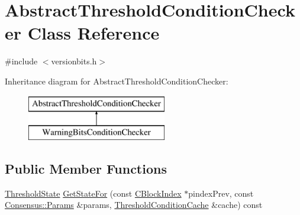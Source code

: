 \hypertarget{class_abstract_threshold_condition_checker}{}\section{Abstract\+Threshold\+Condition\+Checker Class Reference}
\label{class_abstract_threshold_condition_checker}


{\ttfamily \#include $<$versionbits.\+h$>$}

Inheritance diagram for Abstract\+Threshold\+Condition\+Checker\+:\begin{figure}[H]
\begin{center}
\leavevmode
\includegraphics[height=2.000000cm]{class_abstract_threshold_condition_checker}
\end{center}
\end{figure}
\subsection*{Public Member Functions}
\begin{DoxyCompactItemize}
\item 
\mbox{\hyperlink{versionbits_8h_ae7f620361ae33b80687a42adb26fd7a4}{Threshold\+State}} \mbox{\hyperlink{class_abstract_threshold_condition_checker_a7986d06396d52f6961d7c983dc68b8f3}{Get\+State\+For}} (const \mbox{\hyperlink{class_c_block_index}{C\+Block\+Index}} $\ast$pindex\+Prev, const \mbox{\hyperlink{chainparams_8h_a5e1ca1b35c3dd1a4e20f18445f28dd9c}{Consensus\+::\+Params}} \&params, \mbox{\hyperlink{versionbits_8h_a06fae3f599b3fadc0ea127cd55c111ab}{Threshold\+Condition\+Cache}} \&cache) const
\end{DoxyCompactItemize}
